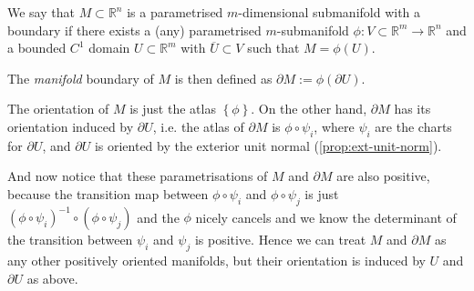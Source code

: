 \newpage

\begin{definition}\label{def:param-subm-boundary}
	We say that $M \subset \mathbb{R}^{n}$ is a parametrised $m$-dimensional submanifold with a boundary if there exists a (any) parametrised $m$-submanifold $\phi: V \subset \mathbb{R}^{m} \to \mathbb{R}^{n}$ and a bounded $C^{1}$ domain $U \subset \mathbb{R}^{m}$ with $\overline{ U } \subset V$ such that $M = \phi(U)$.

	The \textit{manifold} boundary of $M$ is then defined as $\partial M := \phi(\partial U)$.

	The orientation of $M$ is just the atlas $\left\{ \phi \right\}$. On the other hand, $\partial M$ has its orientation induced by $\partial U$, i.e. the atlas of $\partial M$ is $\phi \circ \psi_{i}$, where $\psi_{i}$ are the charts for $\partial U$, and $\partial U$ is oriented by the exterior unit normal (\ref{prop:ext-unit-norm}).

	And now notice that these parametrisations of $M$ and $\partial M$ are also positive, because the transition map between $\phi \circ \psi_{i}$ and $\phi \circ \psi_{j}$ is just $(\phi \circ \psi_{i})^{-1} \circ (\phi \circ \psi_{j})$ and the $\phi$ nicely cancels and we know the determinant of the transition between $\psi_{i}$ and $\psi_{j}$ is positive. Hence we can treat $M$ and $\partial M$ as any other positively oriented manifolds, but their orientation is induced by $U$ and $\partial U$ as above.
\end{definition}

